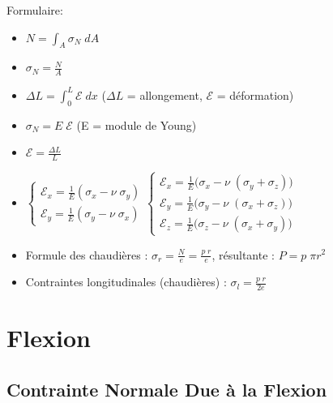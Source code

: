 \documentclass[a4paper]{article}
\begin{document}
Formulaire:
\begin{itemize}

\item $\displaystyle N = \int_A \sigma_N \; d A $
\item $\displaystyle \sigma_N = \frac{N}{A} $
\item $\displaystyle \Delta L = \int_0^L \mathcal{E} \; d x $ ($ \Delta L $ = allongement, $ \mathcal{E} $ = déformation)
\item $\displaystyle \sigma_N = E \; \mathcal{E} $ \; (E = module de Young)
\item $\displaystyle \mathcal{E} = \frac{\Delta L}{L} $
\item $ \begin{cases}
\displaystyle \mathcal{E}_x = \frac{1}{E} (\sigma_x - \nu \; \sigma_y) \\
\displaystyle \mathcal{E}_y = \frac{1}{E} (\sigma_y - \nu \; \sigma_x)
\end{cases}
\begin{cases}
\displaystyle \mathcal{E}_x = \frac{1}{E} \big( \sigma_x - \nu \; (\sigma_y + \sigma_z) \big) \\
\displaystyle \mathcal{E}_y = \frac{1}{E} \big( \sigma_y - \nu \; (\sigma_x + \sigma_z) \big) \\
\displaystyle \mathcal{E}_z = \frac{1}{E} \big( \sigma_z - \nu \; (\sigma_x + \sigma_y) \big)
\end{cases} $
\item Formule des chaudières : $\displaystyle \sigma_r = \frac{N}{e} = \frac{p \; r}{e} $, résultante : $\displaystyle P = p \; \pi r^2 $
\item Contraintes longitudinales (chaudières) : $\displaystyle \sigma_l = \frac{p \; r}{2 e} $

\end{itemize}










\section{Flexion}





\subsection{Contrainte Normale Due à la Flexion}
\end{document}
